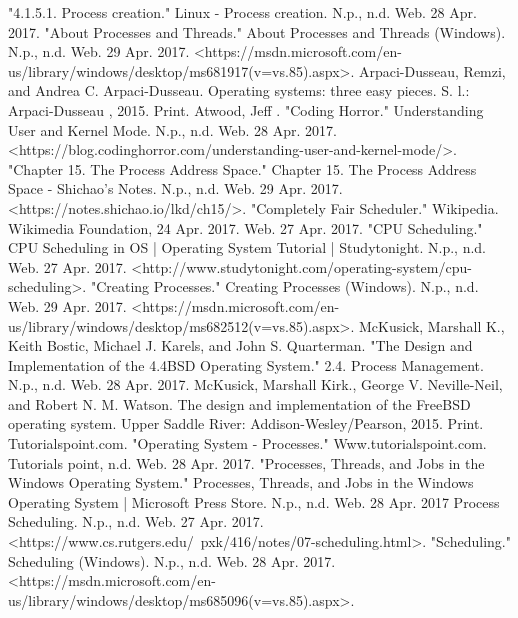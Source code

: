 \documentclass[onecolumn, draftclsnofoot,10pt, compsoc]{IEEEtran}
\begin{document}
\begin{thebibliography}{7}
 "4.1.5.1. Process creation." Linux - Process creation. N.p., n.d. Web. 28 Apr. 2017.
 "About Processes and Threads." About Processes and Threads (Windows). N.p., n.d. Web. 29 Apr.
2017. <https://msdn.microsoft.com/en-us/library/windows/desktop/ms681917(v=vs.85).aspx>.
 Arpaci-Dusseau, Remzi, and Andrea C. Arpaci-Dusseau. Operating systems: three easy pieces. S. l.: Arpaci-Dusseau , 2015. Print.
 Atwood, Jeff . "Coding Horror." Understanding User and Kernel Mode. N.p., n.d. Web. 28 Apr. 2017. <https://blog.codinghorror.com/understanding-user-and-kernel-mode/>.
 "Chapter 15. The Process Address Space." Chapter 15. The Process Address Space - Shichao's Notes. N.p., n.d. Web. 29 Apr. 2017. <https://notes.shichao.io/lkd/ch15/>.
 "Completely Fair Scheduler." Wikipedia. Wikimedia Foundation, 24 Apr. 2017. Web. 27 Apr. 2017.
 "CPU Scheduling." CPU Scheduling in OS | Operating System Tutorial | Studytonight. N.p., n.d. Web. 27 Apr. 2017. <http://www.studytonight.com/operating-system/cpu-scheduling>.
 "Creating Processes." Creating Processes (Windows). N.p., n.d. Web. 29 Apr. 2017. <https://msdn.microsoft.com/en-us/library/windows/desktop/ms682512(v=vs.85).aspx>.
 McKusick, Marshall K., Keith Bostic, Michael J. Karels, and John S. Quarterman. "The Design and Implementation of the 4.4BSD Operating System." 2.4. Process Management. N.p., n.d. Web. 28 Apr. 2017.
    McKusick, Marshall Kirk., George V. Neville-Neil, and Robert N. M. Watson. The design and implementation of the FreeBSD operating system. Upper Saddle River: Addison-Wesley/Pearson, 2015. Print.
    Tutorialspoint.com. "Operating System - Processes." Www.tutorialspoint.com. Tutorials point, n.d. Web. 28 Apr. 2017.
    "Processes, Threads, and Jobs in the Windows Operating System." Processes, Threads, and Jobs in the Windows Operating System | Microsoft Press Store. N.p., n.d. Web. 28 Apr. 2017
    Process Scheduling. N.p., n.d. Web. 27 Apr. 2017. <https://www.cs.rutgers.edu/~pxk/416/notes/07-scheduling.html>.
    "Scheduling." Scheduling (Windows). N.p., n.d. Web. 28 Apr. 2017. <https://msdn.microsoft.com/en-us/library/windows/desktop/ms685096(v=vs.85).aspx>.

\end{thebibliography}
\end{document}
